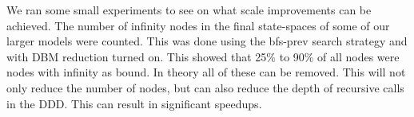 We ran some small experiments to see on what scale improvements can be achieved. The number of infinity nodes in the final state-spaces of some of our larger models were counted. This was done using the bfs-prev search strategy and with DBM reduction turned on. This showed that 25\% to 90\% of all nodes were nodes with infinity as bound. In theory all of these can be removed. This will not only reduce the number of nodes, but can also reduce the depth of recursive calls in the DDD. This can result in significant speedups.